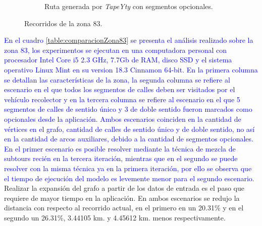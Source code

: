 \documentclass[spanish, conference]{IEEEtran}
\begin{document}
{\begin{figure}[!tbp]
\begin{subfigure}[b]{1\textwidth}
        \caption{Ruta generada por \textit{TapeYty} con segmentos opcionales.}
        \label{fig:RecorridoTapeYtyZona83Opcionales}
    \end{subfigure}
  \caption{Recorridos de la zona 83.}
\end{figure}


\textcolor{blue}{En el cuadro \ref{table:comparacionZona83} se presenta el análisis realizado sobre la zona 83, los experimentos se ejecutan en una computadora personal con procesador Intel\textcopyright{}  Core\texttrademark{} i5 2.3 GHz, 7.7Gb de RAM, disco SSD y el sistema operativo Linux Mint en su version 18.3 Cinnamon 64-bit. En la primera columna se detallan las características de la zona, la segunda columna se refiere al escenario en el que todos los segmentos de calles deben ser visitados por el vehículo recolector y en la tercera columna se refiere al escenario en el que 5 segmentos de calles de sentido único y 3 de doble sentido fueron marcados como opcionales desde la aplicación. Ambos escenarios coinciden en la cantidad de vértices en el grafo, cantidad de calles de sentido único y de doble sentido, no así en la cantidad de arcos auxiliares, debido a la cantidad de segmentos opcionales. En el primer escenario es posible resolver mediante la técnica de mezcla de subtours recién en la tercera iteración, mientras que en el segundo se puede resolver con la misma técnica ya en la primera iteración, por ello se observa que el tiempo de ejecución del modelo es levemente menor para el segundo escenario.} Realizar la expansión del grafo a partir de los datos de entrada es el paso que requiere de mayor tiempo en la aplicación. En ambos escenarios se redujo la distancia con respecto al recorrido actual, en el primero en un 20.31\%  y en el segundo un 26.31\%, 3.44105 km. y 4.45612 km. menos respectivamente.

}
\end{document}
